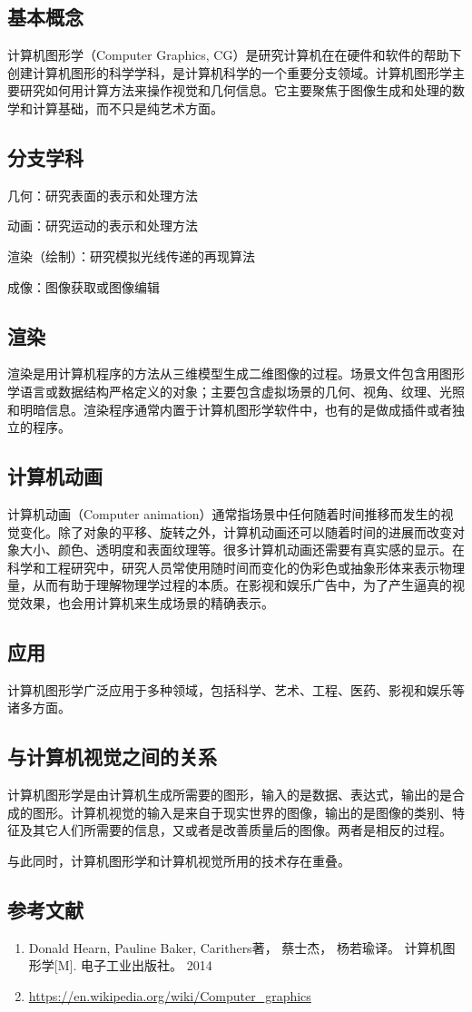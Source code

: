 
\subsection{基本概念}
计算机图形学（Computer Graphics, CG）是研究计算机在在硬件和软件的帮助下创建计算机图形的科学学科，是计算机科学的一个重要分支领域。计算机图形学主要研究如何用计算方法来操作视觉和几何信息。它主要聚焦于图像生成和处理的数学和计算基础，而不只是纯艺术方面。

\subsection{分支学科}
几何：研究表面的表示和处理方法

动画：研究运动的表示和处理方法

渲染（绘制）：研究模拟光线传递的再现算法

成像：图像获取或图像编辑


\subsection{渲染}
渲染是用计算机程序的方法从三维模型生成二维图像的过程。场景文件包含用图形学语言或数据结构严格定义的对象；主要包含虚拟场景的几何、视角、纹理、光照和明暗信息。渲染程序通常内置于计算机图形学软件中，也有的是做成插件或者独立的程序。



\subsection{计算机动画}
计算机动画（Computer animation）通常指场景中任何随着时间推移而发生的视觉变化。除了对象的平移、旋转之外，计算机动画还可以随着时间的进展而改变对象大小、颜色、透明度和表面纹理等。很多计算机动画还需要有真实感的显示。在科学和工程研究中，研究人员常使用随时间而变化的伪彩色或抽象形体来表示物理量，从而有助于理解物理学过程的本质。在影视和娱乐广告中，为了产生逼真的视觉效果，也会用计算机来生成场景的精确表示。


\subsection{应用}
计算机图形学广泛应用于多种领域，包括科学、艺术、工程、医药、影视和娱乐等诸多方面。

\subsection{与计算机视觉之间的关系}
计算机图形学是由计算机生成所需要的图形，输入的是数据、表达式，输出的是合成的图形。计算机视觉的输入是来自于现实世界的图像，输出的是图像的类别、特征及其它人们所需要的信息，又或者是改善质量后的图像。两者是相反的过程。

与此同时，计算机图形学和计算机视觉所用的技术存在重叠。


\subsection{参考文献}
\begin{enumerate}
\item Donald Hearn, Pauline Baker, Carithers著， 蔡士杰， 杨若瑜译。 计算机图形学[M]. 电子工业出版社。 2014
\item \href{https://en.wikipedia.org/wiki/Computer\_graphics}{https://en.wikipedia.org/wiki/Computer\_graphics}
\end{enumerate}
